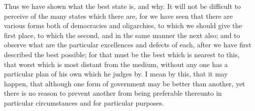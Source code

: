 Thus we have shown what the best state is, and why. It will not be
difficult to perceive of the many states which there are, for we have seen
that there are various forms both of democracies and oligarchies, to which
we should give the first place, to which the second, and in the same
manner the next also; and to observe what are the particular excellences
and defects of each, after we have first described the best possible; for
that must be the best which is nearest to this, that worst which is most
distant from the medium, without any one has a particular plan of his own
which he judges by. I mean by this, that it may happen, that although one
form of government may be better than another, yet there is no reason to
prevent another from being preferable thereunto in particular
circumstances and for particular purposes.


